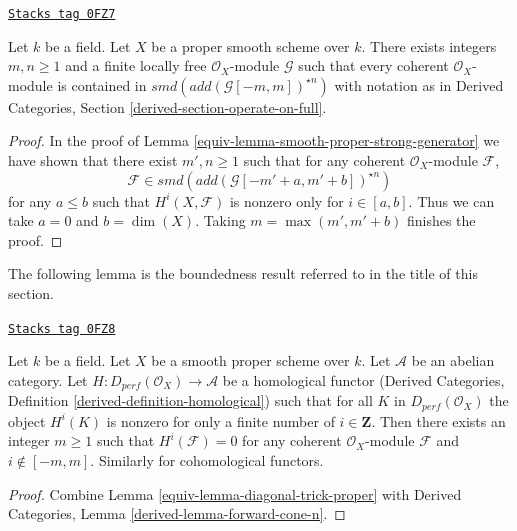 \begin{lemma}
\label{equiv-lemma-diagonal-trick-proper}
\href{https://stacks.math.columbia.edu/tag/0FZ7}{\texttt{Stacks tag 0FZ7}}

Let $k$ be a field. Let $X$ be a proper smooth scheme over $k$.
There exists integers $m, n \geq 1$ and a finite locally free
$\mathcal{O}_X$-module $\mathcal{G}$ such that every coherent
$\mathcal{O}_X$-module is contained in $smd(add(\mathcal{G}[-m, m])^{\star n})$
with notation as in Derived Categories, Section
\ref{derived-section-operate-on-full}.
\end{lemma}

\begin{proof}

In the proof of Lemma \ref{equiv-lemma-smooth-proper-strong-generator}
we have shown that there exist $m', n \geq 1$ such that for any
coherent $\mathcal{O}_X$-module $\mathcal{F}$,
$$
\mathcal{F} \in smd(add(\mathcal{G}[-m' + a, m' + b])^{\star n})
$$
for any $a \leq b$ such that $H^i(X, \mathcal{F})$ is nonzero only
for $i \in [a, b]$. Thus we can take $a = 0$ and $b = \dim(X)$.
Taking $m = \max(m', m' + b)$ finishes the proof.
\end{proof}

The following lemma is the boundedness result referred to
in the title of this section.

\begin{lemma}[Boundedness]
\label{equiv-lemma-boundedness}
\href{https://stacks.math.columbia.edu/tag/0FZ8}{\texttt{Stacks tag 0FZ8}}

Let $k$ be a field. Let $X$ be a smooth proper scheme over $k$.
Let $\mathcal{A}$ be an abelian category. Let
$H : D_{perf}(\mathcal{O}_X) \to \mathcal{A}$ be a homological
functor (Derived Categories, Definition \ref{derived-definition-homological})
such that for all $K$ in $D_{perf}(\mathcal{O}_X)$ the object
$H^i(K)$ is nonzero for only a finite number of $i \in \mathbf{Z}$.
Then there exists an integer $m \geq 1$ such that
$H^i(\mathcal{F}) = 0$ for any coherent $\mathcal{O}_X$-module
$\mathcal{F}$ and $i \not \in [-m, m]$.
Similarly for cohomological functors.
\end{lemma}

\begin{proof}

Combine Lemma \ref{equiv-lemma-diagonal-trick-proper} with
Derived Categories, Lemma \ref{derived-lemma-forward-cone-n}.
\end{proof}

